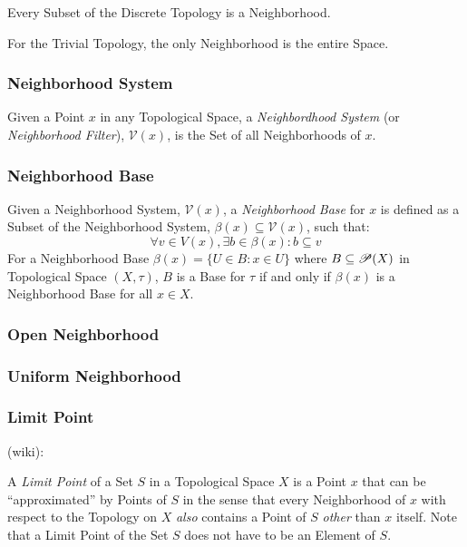 Every Subset of the Discrete Topology is a Neighborhood.

For the Trivial Topology, the only Neighborhood is the entire Space.



\subsubsection{Neighborhood System}\label{sec:neighborhood_system}

Given a Point $x$ in any Topological Space, a \emph{Neighbordhood
  System} (or \emph{Neighborhood Filter}), $\mathcal{V}(x)$, is the
Set of all Neighborhoods of $x$.



\subsubsection{Neighborhood Base}\label{sec:neighborhood_base}

Given a Neighborhood System, $\mathcal{V}(x)$, a \emph{Neighborhood
  Base} for $x$ is defined as a Subset of the Neighborhood System,
$\beta(x) \subseteq \mathcal{V}(x)$, such that:
\[
  \forall v \in V(x), \exists b \in \beta(x) : b \subseteq v
\]
For a Neighborhood Base $\beta(x) = \{ U \in B : x \in U \}$ where $B
\subseteq \mathscr{P}(X)$ in Topological Space $(X,\tau)$, $B$ is a
Base for $\tau$ if and only if $\beta(x)$ is a Neighborhood Base for
all $x \in X$.



\subsubsection{Open Neighborhood}\label{sec:open_neighborhood}

\subsubsection{Uniform Neighborhood}\label{sec:uniform_neighborhood}

\subsubsection{Limit Point}\label{sec:limit_point}

(wiki):

A \emph{Limit Point} of a Set $S$ in a Topological Space $X$ is a Point $x$
that can be ``approximated'' by Points of $S$ in the sense that every
Neighborhood of $x$ with respect to the Topology on $X$ \emph{also} contains a
Point of $S$ \emph{other} than $x$ itself. Note that a Limit Point of the Set
$S$ does not have to be an Element of $S$.

